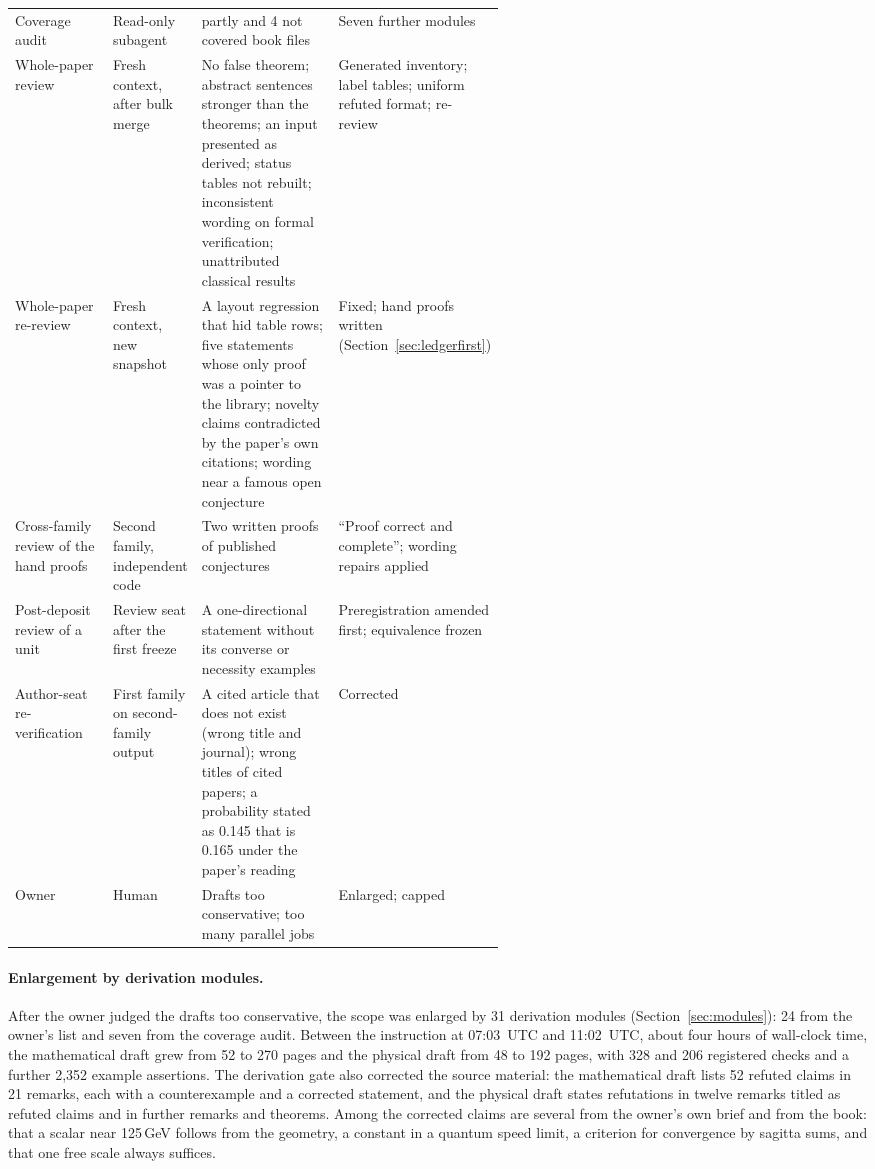 \documentclass[11pt]{article}
\begin{document}
\begin{table}[htbp]
\begin{tabularx}{\linewidth}{@{}>{\raggedright\arraybackslash}p{0.2\linewidth}>{\raggedright\arraybackslash}p{0.17\linewidth}>{\raggedright\arraybackslash}X>{\raggedright\arraybackslash}p{0.2\linewidth}@{}}
Coverage audit & Read-only subagent & 28 partly and 4 not covered book files & Seven further modules \\
Whole-paper review & Fresh context, after bulk merge & No false theorem; abstract sentences stronger than the theorems; an input presented as derived; status tables not rebuilt; inconsistent wording on formal verification; unattributed classical results & Generated inventory; label tables; uniform refuted format; re-review \\
Whole-paper re-review & Fresh context, new snapshot & A layout regression that hid table rows; five statements whose only proof was a pointer to the library; novelty claims contradicted by the paper's own citations; wording near a famous open conjecture & Fixed; hand proofs written (Section~\ref{sec:ledgerfirst}) \\
Cross-family review of the hand proofs & Second family, independent code & Two written proofs of published conjectures & ``Proof correct and complete''; wording repairs applied \\
Post-deposit review of a unit & Review seat after the first freeze & A one-directional statement without its converse or necessity examples & Preregistration amended first; equivalence frozen \\
Author-seat re-verification & First family on second-family output & A cited article that does not exist (wrong title and journal); wrong titles of cited papers; a probability stated as 0.145 that is 0.165 under the paper's reading & Corrected \\
Owner & Human & Drafts too conservative; too many parallel jobs & Enlarged; capped \\
\bottomrule
\end{tabularx}
\end{table}

\paragraph{Enlargement by derivation modules.} After the owner judged the
drafts too conservative, the scope was enlarged by 31 derivation modules
(Section~\ref{sec:modules}): 24 from the owner's list and seven from the
coverage audit. Between the instruction at 07:03~UTC and 11:02~UTC, about four
hours of wall-clock time, the mathematical draft grew from 52 to 270 pages and
the physical draft from 48 to 192 pages, with 328 and 206 registered checks
and a further 2{,}352 example assertions. The derivation gate also corrected
the source material: the mathematical draft lists 52 refuted claims in 21
remarks, each with a counterexample and a corrected statement, and the
physical draft states refutations in twelve remarks titled as refuted claims
and in further remarks and theorems. Among the corrected claims are several
from the owner's own brief and from the book: that a scalar near 125\,GeV
follows from the geometry, a constant in a quantum speed limit, a criterion
for convergence by sagitta sums, and that one free scale always suffices.
\end{document}
